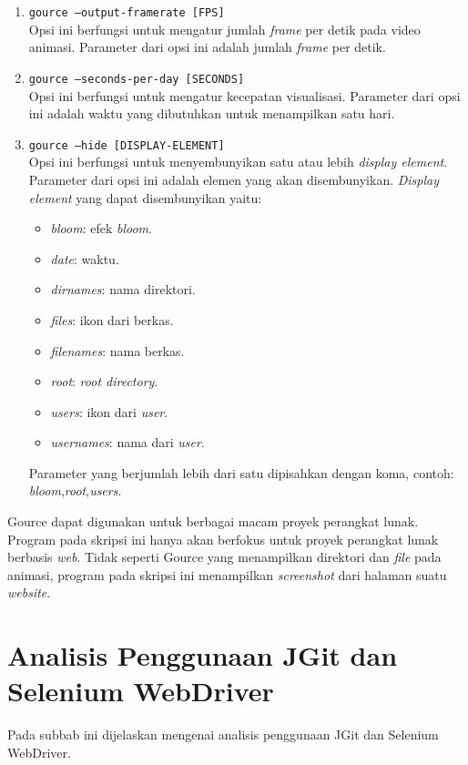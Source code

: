 \begin{enumerate}
\item \texttt{gource --output-framerate [FPS]}\\
Opsi ini berfungsi untuk mengatur jumlah \textit{frame} per detik pada video animasi. Parameter dari opsi ini adalah jumlah \textit{frame} per detik.

\item \texttt{gource --seconds-per-day [SECONDS]}\\
Opsi ini berfungsi untuk mengatur kecepatan visualisasi. Parameter dari opsi ini adalah waktu yang dibutuhkan untuk menampilkan satu hari.

\item \texttt{gource --hide [DISPLAY-ELEMENT]}\\
Opsi ini berfungsi untuk menyembunyikan satu atau lebih \textit{display element}. Parameter dari opsi ini adalah elemen yang akan disembunyikan. \textit{Display element} yang dapat disembunyikan yaitu:
\begin{itemize}
\item \textit{bloom}: efek \textit{bloom}. 
\item \textit{date}: waktu.  
\item \textit{dirnames}: nama direktori. 
\item \textit{files}: ikon dari berkas. 
\item \textit{filenames}: nama berkas. 
\item \textit{root}: \textit{root directory}.
\item \textit{users}: ikon dari \textit{user}.
\item \textit{usernames}: nama dari \textit{user}.
\end{itemize}
Parameter yang berjumlah lebih dari satu dipisahkan dengan koma, contoh: \textit{bloom},\textit{root},\textit{users}.
\end{enumerate}
 
Gource dapat digunakan untuk berbagai macam proyek perangkat lunak. Program pada skripsi ini hanya akan berfokus untuk proyek perangkat lunak berbasis \textit{web}. Tidak seperti Gource yang menampilkan direktori dan \textit{file} pada animasi, program pada skripsi ini menampilkan \textit{screenshot} dari halaman suatu \textit{website}.      
 
\section{Analisis Penggunaan JGit dan Selenium WebDriver}
\label{sec:analisis_jgit_selenium}
Pada subbab ini dijelaskan mengenai analisis penggunaan JGit dan Selenium WebDriver.

